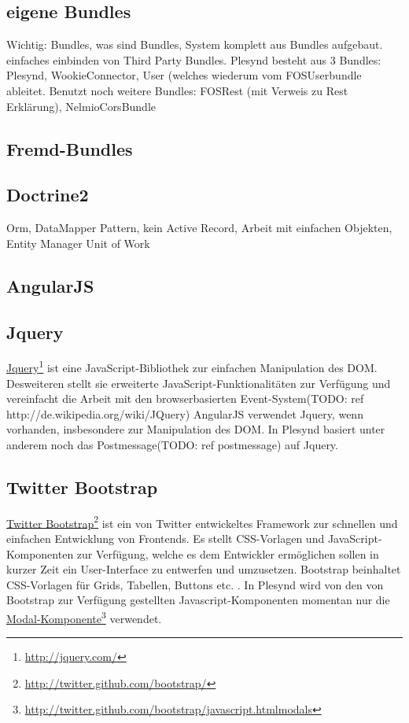 \subsection{eigene Bundles}\label{section:own_bundles}
Wichtig: Bundles, was sind Bundles, System komplett aus Bundles aufgebaut. einfaches einbinden von Third Party Bundles. Plesynd besteht aus 3 Bundles: Plesynd, WookieConnector, User (welches wiederum vom FOSUserbundle ableitet. Benutzt noch weitere Bundles: FOSRest (mit Verweis zu Rest Erklärung), NelmioCorsBundle
\subsection{Fremd-Bundles}\label{section:third_party_bundles}

\subsection{Doctrine2}\label{section:doctrine2}
Orm, DataMapper Pattern, kein Active Record, Arbeit mit einfachen Objekten, Entity Manager Unit of Work

\subsection{AngularJS}

\subsection{Jquery}
\href{http://jquery.com/}{Jquery}\footnote{\url{http://jquery.com/}} ist eine JavaScript-Bibliothek zur einfachen Manipulation des DOM. Desweiteren stellt sie erweiterte JavaScript-Funktionalitäten zur Verfügung und vereinfacht die Arbeit mit den browserbasierten Event-System(TODO: ref http://de.wikipedia.org/wiki/JQuery) AngularJS verwendet Jquery, wenn vorhanden, insbesondere zur Manipulation des DOM. In Plesynd basiert unter anderem noch das Postmessage(TODO: ref postmessage) auf Jquery.  

\subsection{Twitter Bootstrap}
\href{http://twitter.github.com/bootstrap/}{Twitter Bootstrap}\footnote{\url{http://twitter.github.com/bootstrap/}} ist ein von Twitter entwickeltes Framework zur schnellen und einfachen Entwicklung von Frontends. Es stellt CSS-Vorlagen und JavaScript-Komponenten zur Verfügung, welche es dem Entwickler ermöglichen sollen in kurzer Zeit ein User-Interface zu entwerfen und umzusetzen. Bootstrap beinhaltet CSS-Vorlagen für Grids, Tabellen, Buttons etc. . In Plesynd wird von den von Bootstrap zur Verfügung gestellten Javascript-Komponenten momentan nur die \href{http://twitter.github.com/bootstrap/javascript.htmlmodals}{Modal-Komponente}\footnote{\url{http://twitter.github.com/bootstrap/javascript.htmlmodals}} verwendet. 

